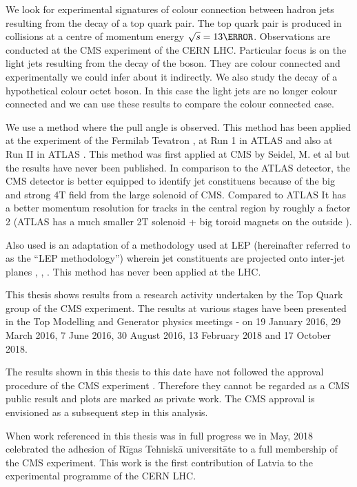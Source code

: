 We look for experimental signatures of colour connection between hadron jets resulting from the decay of a top quark pair. The top quark pair is produced in \Pp\Pp collisions at a centre of momentum energy $\sqrt{s}=13\TeV$. Observations are conducted at the CMS experiment of the CERN LHC. Particular focus is on the light jets resulting from the decay of the \PW boson. They are colour connected and experimentally we could infer about it indirectly. We also study the decay of a hypothetical colour octet \PW boson. In this case the light jets are no longer colour connected and we can use these results to compare the colour connected case. 

We use a method where the pull angle \cite{Gallicchio:2010sw} is observed. This method has been applied at the \DZERO experiment of the Fermilab Tevatron \cite{Abazov:2011vh}, at Run 1 in ATLAS \cite{Aad:2015lxa} and also at Run II in ATLAS \cite{Aaboud:2018ibj}. This method was first applied at CMS by Seidel, M. et al \cite{indico:Markus_cf} but the results have never been published. In comparison to the ATLAS detector, the CMS detector is better equipped to identify jet constituens because of the big and strong 4T field from the large solenoid of CMS. Compared to ATLAS It has a better momentum resolution for tracks in the central region by roughly a factor 2 (ATLAS has a much smaller 2T solenoid + big toroid magnets on the outside \cite{Aad:2008zzm}).

Also used is an adaptation of a methodology used at LEP (hereinafter referred to as the ``LEP methodology'') wherein jet constituents are projected onto inter-jet planes \cite{Abbiendi:2005es}, \cite{Abdallah:2006uq}, \cite{Achard:2003pe}. This method has never been applied at the LHC.

This thesis shows results from a research activity undertaken by the Top Quark group of the CMS experiment. The results at various stages have been presented in the Top Modelling and Generator physics meetings - on 19 January 2016, 29 March 2016, 7 June 2016, 30 August 2016, 13 February 2018 and 17 October 2018.

The results shown in this thesis to this date have not followed the approval procedure of the CMS experiment \cite{twiki:PhysicsApprovals}. Therefore they cannot be regarded as a CMS public result and plots are marked as private work. The CMS approval is envisioned as a subsequent step in this analysis.

When work referenced in this thesis was in full progress we in May, 2018 celebrated the adhesion of Rīgas Tehniskā universitāte to a full membership of the CMS experiment. This work is the first contribution of Latvia to the experimental programme of the CERN LHC.
